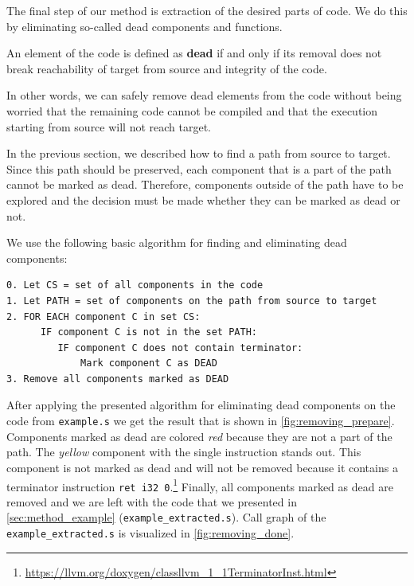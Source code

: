 \documentclass[12pt, twoside]{fithesis2}
\renewcommand{\_}{\leavevmode \kern0.07em\vbox{\hrule width0.4em}}
\begin{document}
The final step of our method is extraction of the desired parts of code.
We do this by eliminating so-called dead components and functions.

An element of the code is defined as \textbf{dead} if and only if its removal
does not break reachability of target from source and integrity of the code.

In other words, we can safely remove dead elements from the code without being
worried that the remaining code cannot be compiled and that the execution
starting from source will not reach target.

In the previous section, we described how to find a path from source to target.
Since this path should be preserved, each component that is a part of the path
cannot be marked as dead.
Therefore, components outside of the path have to be explored and the decision
must be made whether they can be marked as dead or not.

We  use the following basic algorithm for finding and eliminating dead
components:

\begin{verbatim}
0. Let CS = set of all components in the code
1. Let PATH = set of components on the path from source to target
2. FOR EACH component C in set CS:
      IF component C is not in the set PATH:
         IF component C does not contain terminator:
             Mark component C as DEAD
3. Remove all components marked as DEAD
\end{verbatim}

After applying the presented algorithm for eliminating dead components on the
code from \texttt{example.s} we get the result that is shown
in \autoref{fig:removing_prepare}.
Components marked as dead are colored \emph{red} because they are not
a part of the path.
The \emph{yellow} component with the single instruction stands out.
This component is not marked as dead and will not be removed because it contains
a terminator instruction \texttt{ret i32 0}.\footnote{
\url{https://llvm.org/doxygen/classllvm_1_1TerminatorInst.html}
}
Finally, all components marked as dead are removed and we are left with the
code that we presented in \autoref{sec:method_example}
(\texttt{example_extracted.s}).
Call graph of the \texttt{example_extracted.s} is visualized in
\autoref{fig:removing_done}.
\end{document}
